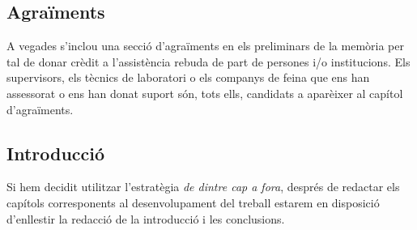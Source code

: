 \subsection{Agraïments}

A vegades s'inclou una secció d'agraïments en els preliminars de la memòria per tal de donar crèdit a l'assistència rebuda de part de persones i/o institucions. Els supervisors, els tècnics de laboratori o els companys de feina que ens han assessorat o ens han donat suport són, tots ells, candidats a aparèixer al capítol d'agraïments.

\subsection{Introducció}

Si hem decidit utilitzar l'estratègia \emph{de dintre cap a fora}, després de redactar els capítols corresponents al desenvolupament del treball estarem en disposició d'enllestir la redacció de la introducció i les conclusions.

